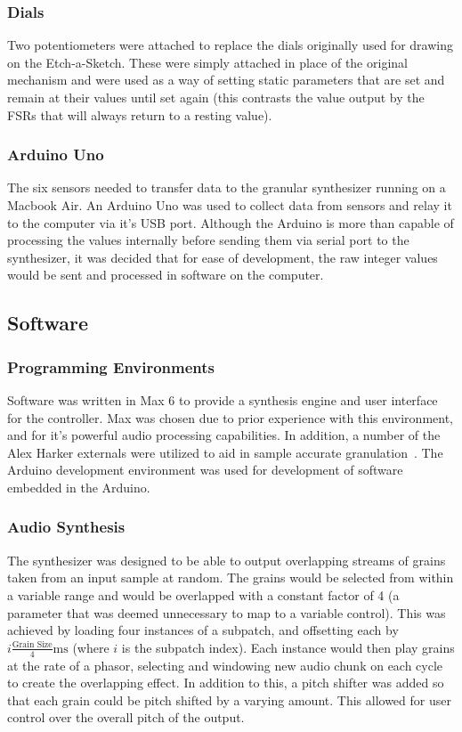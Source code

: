 \documentclass[titlepage]{scrartcl}
\begin{document}
\subsubsection{Dials}
Two potentiometers were attached to replace the dials originally used for
drawing on the Etch-a-Sketch. These were simply attached in place of the
original mechanism and were used as a way of setting static parameters that are
set and remain at their values until set again (this contrasts the value output
by the FSRs that will always return to a resting value).

\subsubsection{Arduino Uno}
The six sensors needed to transfer data to the granular synthesizer running on a
Macbook Air. An Arduino Uno was used to collect data from sensors and relay it to the
computer via it's USB port. Although the Arduino is more than capable of
processing the values internally before sending them via serial port to the
synthesizer, it was decided that for ease of development, the raw integer
values would be sent and processed in software on the computer.

\subsection{Software}
\subsubsection{Programming Environments}
Software was written in Max 6 to provide a synthesis engine and user interface
for the controller. Max was chosen due to prior experience with this
environment, and for it's powerful audio processing capabilities. In addition,
a number of the Alex Harker externals were utilized to aid in sample accurate
granulation~\parencite{harker2012}. The Arduino development environment was
used for development of software embedded in the Arduino.

\subsubsection{Audio Synthesis}
The synthesizer was designed to be able to output overlapping streams of grains
taken from an input sample at random. The grains would be selected from within
a variable range and would be overlapped with a constant factor of 4 (a
parameter that was deemed unnecessary to map to a variable control). This was
achieved by loading four instances of a subpatch, and offsetting each by
$i\frac{\text{Grain Size}}{4}\text{ms}$ (where $i$ is the subpatch index).
Each instance would then play grains at the rate of a phasor, selecting and
windowing new audio chunk on each cycle to create the overlapping effect. 
In addition to this, a pitch shifter was added so that each grain could be
pitch shifted by a varying amount.  This allowed for user control over the
overall pitch of the output.
\end{document}
